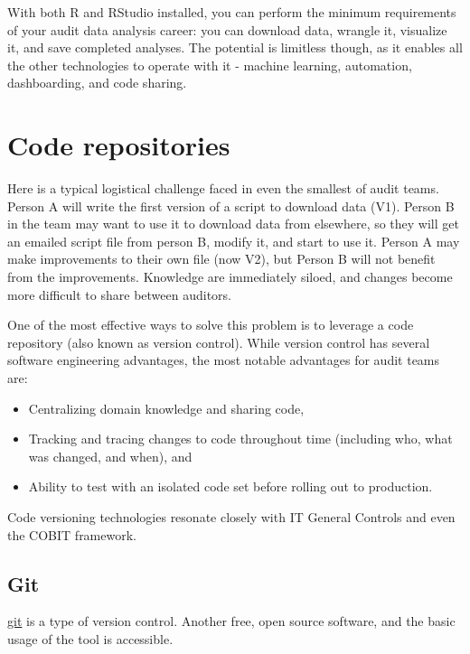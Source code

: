 \documentclass[
]{book}
\providecommand{\tightlist}{%
  \setlength{\itemsep}{0pt}\setlength{\parskip}{0pt}}
\begin{document}
With both R and RStudio installed, you can perform the minimum requirements of your audit data analysis career: you can download data, wrangle it, visualize it, and save completed analyses. The potential is limitless though, as it enables all the other technologies to operate with it - machine learning, automation, dashboarding, and code sharing.

\hypertarget{code-repositories}{%
\section{Code repositories}\label{code-repositories}}

Here is a typical logistical challenge faced in even the smallest of audit teams. Person A will write the first version of a script to download data (V1). Person B in the team may want to use it to download data from elsewhere, so they will get an emailed script file from person B, modify it, and start to use it. Person A may make improvements to their own file (now V2), but Person B will not benefit from the improvements. Knowledge are immediately siloed, and changes become more difficult to share between auditors.

One of the most effective ways to solve this problem is to leverage a code repository (also known as version control). While version control has several software engineering advantages, the most notable advantages for audit teams are:

\begin{itemize}
\tightlist
\item
  Centralizing domain knowledge and sharing code,
\item
  Tracking and tracing changes to code throughout time (including who, what was changed, and when), and
\item
  Ability to test with an isolated code set before rolling out to production.
\end{itemize}

Code versioning technologies resonate closely with IT General Controls and even the COBIT framework.

\hypertarget{git}{%
\subsection{Git}\label{git}}

\href{https://git-scm.com}{git} is a type of version control. Another free, open source software, and the basic usage of the tool is accessible.
\end{document}
